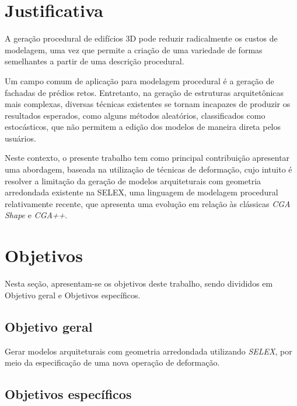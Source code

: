 \section{Justificativa}
\label{sec:justificativa}

A geração procedural de edifícios 3D pode reduzir radicalmente os custos de modelagem, uma vez que permite a criação de uma variedade de formas semelhantes a partir de uma descrição procedural. 

Um campo comum de aplicação para modelagem procedural é a geração de fachadas de prédios retos. Entretanto, na geração de estruturas arquitetônicas mais complexas, diversas técnicas existentes se tornam incapazes de produzir os resultados esperados, como alguns métodos aleatórios, classificados como estocásticos, que não permitem a edição dos modelos de maneira direta pelos usuários.

Neste contexto, o presente trabalho tem como principal contribuição apresentar uma abordagem, baseada na utilização de técnicas de deformação, cujo intuito é resolver a limitação da geração de modelos arquiteturais com geometria arredondada existente na \gls{SELEX}, uma linguagem de modelagem procedural relativamente recente, que apresenta uma evolução em relação às clássicas \textit{CGA Shape} e \textit{CGA++}.

\section{Objetivos}
\label{sec:objetivos}

Nesta seção, apresentam-se os objetivos deste trabalho, sendo divididos em Objetivo geral e Objetivos específicos.

\subsection{Objetivo geral}
\label{sec:objetivos_gerais}

Gerar modelos arquiteturais com geometria arredondada utilizando \textit{SELEX}, por meio da especificação de uma nova operação de deformação.


\subsection{Objetivos específicos}
\label{sec:objetivos_especificos}


